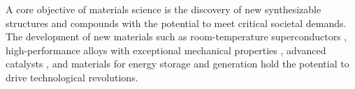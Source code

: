 
A core objective of materials science is the discovery of new synthesizable structures and compounds with the potential to meet critical societal demands.
The development of new materials such as room-temperature superconductors \citep{boeri_2021_2022}, high-performance alloys with exceptional mechanical properties \citep{gludovatz_fractureresistant_2014, gludovatz_exceptional_2016, george_highentropy_2019}, advanced catalysts \citep{strmcnik_design_2016, nakaya_catalysis_2023}, and materials for energy storage and generation \citep{liu_advanced_2010, snyder_complex_2008} hold the potential to drive technological revolutions.


